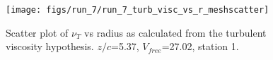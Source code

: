 \begin{figure}[H]
\centering
\texttt{[image: figs/run\_7/run\_7\_turb\_visc\_vs\_r\_meshscatter]}
\caption{Scatter plot of $\nu_T$ vs radius as calculated from the turbulent viscosity hypothesis. $z/c$=5.37, $V_{free}$=27.02, station 1.}
\label{fig:run_7_turb_visc_vs_r_meshscatter}
\end{figure}


